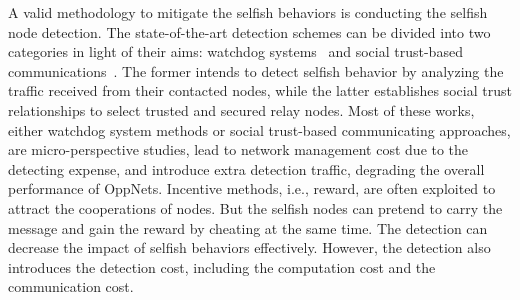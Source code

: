 %
A valid methodology to mitigate the selfish behaviors
is conducting the selfish node detection.
The state-of-the-art detection schemes
can be divided into two categories
in light of their aims:
watchdog systems~\cite{DBLP:conf/mobicom/MartiGLB00,
DBLP:journals/tmc/Hernandez-Orallo15,
DBLP:journals/tie/DiasRXM15,
DBLP:journals/fgcs/JedariXCDTA19}
and social trust-based communications~\cite{DBLP:journals/tpds/ZhuDGDC14,
DBLP:journals/tdsc/ChoC18,
DBLP:conf/sigcomm/SouzaMSMCC16,
DBLP:journals/tmc/ChoiSLW12}.
The former intends to detect selfish behavior
by analyzing the traffic received 
from their contacted nodes,
while the latter establishes social trust relationships
to select trusted and secured relay nodes.
Most of these works,
either watchdog system methods
or social trust-based communicating approaches,
are micro-perspective studies,
lead to network management cost
due to the detecting expense,
and introduce extra detection traffic,
degrading the overall performance of OppNets.
Incentive methods, i.e., reward,
are often exploited to attract the cooperations of nodes.
But the selfish nodes can pretend to carry the message
and gain the reward by cheating at the same time.
The detection can decrease the impact of selfish behaviors effectively.
However, the detection also introduces the detection cost,
including the computation cost and the communication cost.

